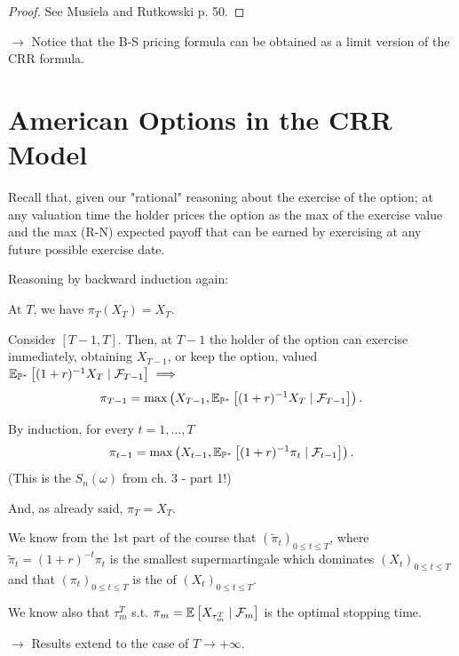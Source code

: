 \begin{proof}
    See Musiela and Rutkowski p. 50.
\end{proof}

\begin{remark}
    $\to$ Notice that the B-S pricing formula can be obtained as a limit version of the CRR formula.
\end{remark}

\section{American Options in the CRR Model}

\begin{remark}
    Recall that, given our "rational" reasoning about the exercise of the option; at any valuation time the holder prices the option as the max of the exercise value and the max (R-N) expected payoff that can be earned by exercising at any future possible exercise date.
    
    Reasoning by backward induction again:
    
    At $T$, we have $\pi_T(X_T) = X_T$.
    
    Consider $[T-1, T]$. Then, at $T-1$ the holder of the option can exercise immediately, obtaining $X_{T-1}$, or keep the option, valued $\mathbb E_{\mathbb P^*} \left[ (1+r)^{-1} X_T \mid \mathcal{F}_{T-1} \right] \implies$
    \[ \pi_{T-1} = \max \left( X_{T-1}, \mathbb E_{\mathbb P^*} \left[ (1+r)^{-1} X_T \mid \mathcal{F}_{T-1} \right] \right). \]
    
    By induction, for every $t=1, \dots, T$
    \[ \pi_{t-1} = \max \left( X_{t-1}, \mathbb E_{\mathbb P^*} \left[ (1+r)^{-1} \pi_t \mid \mathcal{F}_{t-1} \right] \right). \]
    (This is the  $S_n(\omega)$ from ch. 3 - part 1!)
    
    And, as already said, $\pi_T = X_T$.
\end{remark}

\begin{remark}
    We know from the 1st part of the course that $(\tilde{\pi}_t)_{0 \leq t \leq T}$, where $\tilde{\pi}_t = (1+r)^{-t} \pi_t$ is the smallest supermartingale which dominates $(X_t)_{0 \leq t \leq T}$ and that $(\pi_t)_{0 \leq t \leq T}$ is the  of $(X_t)_{0 \leq t \leq T}$.
    
    We know also that $\tau_m^T$ s.t. $\pi_m = \mathbb E \left[ X_{\tau_m^T} \mid \mathcal{F}_m \right]$ is the optimal stopping time.
    
    $\to$ Results extend to the case of $T \to +\infty$.
\end{remark}

